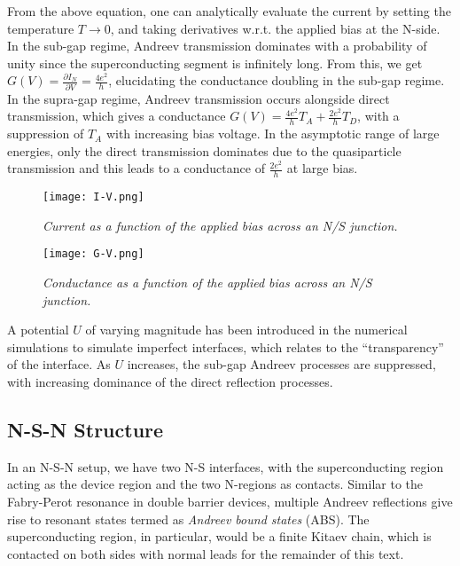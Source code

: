 From the above equation, one can analytically evaluate the current by setting the temperature $T \rightarrow 0$, and taking derivatives w.r.t. the applied bias at the N-side. In the sub-gap regime, Andreev transmission dominates with a probability of unity since the superconducting segment is infinitely long. From this, we get $G(V) = \frac{\partial I_{N}}{\partial V} = \frac{4e^{2}}{h}$, elucidating the conductance doubling in the sub-gap regime. In the supra-gap regime, Andreev transmission occurs alongside direct transmission, which gives a conductance $G(V) = \frac{4e^{2}}{h}T_{A} + \frac{2e^{2}}{h}T_{D}$, with a suppression of $T_{A}$ with increasing bias voltage. In the asymptotic range of large energies, only the direct transmission dominates due to the quasiparticle transmission and this leads to a conductance of $\frac{2e^{2}}{h}$ at large bias. \par 

\vspace{3cm}

\begin{figure}[h]
\centering
\texttt{[image: I-V.png]}
\caption{\textit{Current as a function of the applied bias across an N/S junction.}}
\end{figure}

\clearpage

\begin{figure}[h]
\centering
\texttt{[image: G-V.png]}
\caption{\textit{Conductance as a function of the applied bias across an N/S junction.}}
\end{figure}

\vspace{1cm}

A potential $U$ of varying magnitude has been introduced in the numerical simulations to simulate imperfect interfaces, which relates to the ``transparency'' of the interface. As $U$ increases, the sub-gap Andreev processes are suppressed, with increasing dominance of the direct reflection processes.


\subsection{N-S-N Structure}

In an N-S-N setup, we have two N-S interfaces, with the superconducting region acting as the device region and the two N-regions as contacts. Similar to the Fabry-Perot resonance in double barrier devices, multiple Andreev reflections give rise to resonant states termed as \textit{Andreev bound states} (ABS). The superconducting region, in particular, would be a finite Kitaev chain, which is contacted on both sides with normal leads for the remainder of this text. \par 

